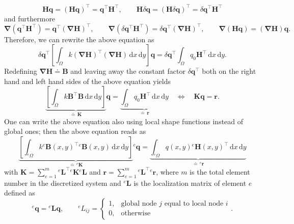 \documentclass[a4paper,11pt]{article}
\numberwithin{equation}{section}
\newcommand\matr[1]{\ensuremath{\boldsymbol{\mathbf{#1}}}}
\newcommand\vect[1]{\ensuremath{\bm{#1}}}
\begin{document}
{\begin{equation}
	\vect{H}\vect{q} = (\vect{H}\vect{q})^\top = \vect{q}^\top \vect{H}^\top, \qquad \vect{H}\delta \vect{q} = (\vect{H}\delta \vect{q})^\top = \delta \vect{q}^\top \vect{H}^\top
\end{equation} and furthermore \begin{equation}
	\vect{\nabla}(\vect{q}^\top \vect{H}^\top) = \vect{q}^\top (\vect{\nabla}\vect{H})^\top, \qquad \vect{\nabla}(\delta \vect{q}^\top \vect{H}^\top) = \delta \vect{q}^\top (\vect{\nabla}\vect{H})^\top, \qquad \vect{\nabla}(\vect{H}\vect{q}) = (\vect{\nabla}\vect{H})\vect{q}.
\end{equation} Therefore, we can rewrite the above equation as \begin{equation}
	\delta \vect{q}^\top \left[\int_\Omega k (\vect{\nabla}\vect{H})^\top (\vect{\nabla}\vect{H})\,\mathrm{d}x\,\mathrm{d}y\right] \vect{q} = \delta \vect{q}^\top \int_\Omega q_0 \vect{H}^\top \,\mathrm{d}x\,\mathrm{d}y.
\end{equation} Redefining $\vect{\nabla}\vect{H}\doteq \matr{B}$ and leaving away the constant factor $\delta \vect{q}^\top$ both on the right hand and left hand sides of the above equation yields \begin{equation}
	\underbrace{\left[\int_\Omega k \matr{B}^\top \matr{B}\,\mathrm{d}x\,\mathrm{d}y\right]}_{\doteq\,\matr{K}} \vect{q} = \underbrace{\int_\Omega q_0 \vect{H}^\top \,\mathrm{d}x\,\mathrm{d}y}_{\doteq\,\vect{r}} \quad \Leftrightarrow \quad \matr{K}\vect{q} = \vect{r}.
\end{equation} One can write the above equation also using local shape functions instead of global ones; then the above equation reads as \begin{equation}
	\underbrace{\left[\int_{{}^e \Omega} k {}^e \matr{B}(x,y)^\top {}^e \matr{B}(x,y)\,\mathrm{d}x\,\mathrm{d}y\right]}_{\doteq \, {}^e \matr{K}}  {}^e\vect{q} = \underbrace{\int_{{}^e \Omega} q(x,y) {}^e\vect{H}(x,y)^\top \,\mathrm{d}x\,\mathrm{d}y}_{\doteq \, {}^e\vect{r}}
\end{equation} with $\matr{K} = \sum_{e=1}^m {}^e \matr{L}^\top {}^e\matr{K}{}^e\matr{L}$ and $\vect{r} = \sum_{e=1}^m {}^e \matr{L}^\top {}^e \vect{r}$, where $m$ is the total element number in the discretized system and ${}^e \matr{L}$ is the localization matrix of element $e$ defined as \begin{equation}
	{}^e \vect{q} = {}^e \matr{L}\vect{q}, \qquad {}^e L_{ij} = \begin{cases}
		1, & \text{global node $j$ equal to local node $i$} \\
		0, & \text{otherwise}
	\end{cases}.
\end{equation}

}
\end{document}
